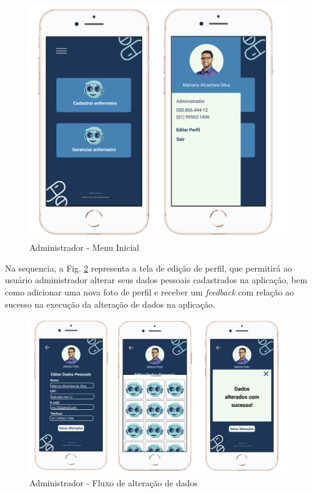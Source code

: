 \begin{figure}[H]
    \centering
    \includegraphics[width=12cm]{figuras/software/Atual_prototipo/Admin_TelaInicial_e_Sidebar.png}
    \caption{Administrador - Menu Inicial}
    \label{fig:prototipo_admin_tela_inicial_e_sidebar}
\end{figure}

Na sequencia, a Fig. \ref{fig:prototipo_admin_alterarDados} representa a tela de edição de perfil, que permitirá ao usuário administrador alterar seus dados pessoais cadastrados na aplicação, bem como adicionar uma nova foto de perfil e receber um \textit{feedback} com relação ao sucesso na execução da alteração de dados na aplicação.

\begin{figure}[H]
    \centering
    \includegraphics[width=15cm]{figuras/software/Atual_prototipo/Admin_AlterarDados.png}
    \caption{Administrador - Fluxo de alteração de dados}
    \label{fig:prototipo_admin_alterarDados}
\end{figure}

